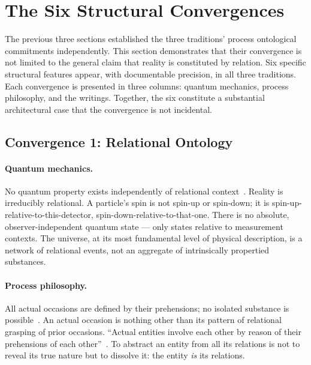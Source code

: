 
\section{The Six Structural Convergences}
\label{sec:convergences}

The previous three sections established the three traditions' process ontological
commitments independently.
This section demonstrates that their convergence is not limited to the
general claim that reality is constituted by relation.
Six specific structural features appear, with documentable precision,
in all three traditions.
Each convergence is presented in three columns: quantum mechanics,
process philosophy, and the \bahai writings.
Together, the six constitute a substantial architectural case that the
convergence is not incidental.

\subsection{Convergence 1: Relational Ontology}

\paragraph{Quantum mechanics.}
No quantum property exists independently of relational context~\citep{Rovelli1996}.
Reality is irreducibly relational.
A particle's spin is not spin-up or spin-down; it is spin-up-relative-to-this-detector,
spin-down-relative-to-that-one.
There is no absolute, observer-independent quantum state --- only states
relative to measurement contexts.
The universe, at its most fundamental level of physical description, is
a network of relational events, not an aggregate of intrinsically propertied
substances.

\paragraph{Process philosophy.}
All actual occasions are defined by their prehensions; no isolated substance
is possible~\citep{Whitehead1929}.
An actual occasion is nothing other than its pattern of relational grasping
of prior occasions.
``Actual entities involve each other by reason of their prehensions of
each other''~\citep[p.~20]{Whitehead1929}. %
To abstract an entity from all its relations is not to reveal its true
nature but to dissolve it: the entity \emph{is} its relations.

